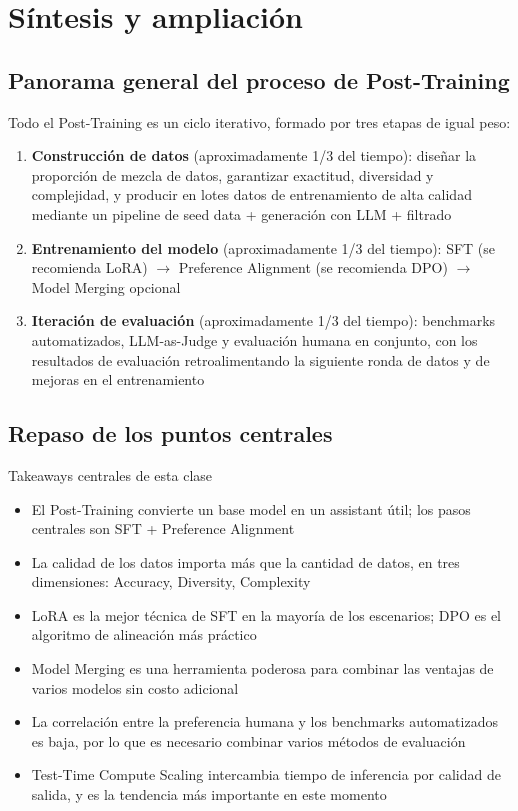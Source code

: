 \section{Síntesis y ampliación}

\subsection{Panorama general del proceso de Post-Training}

Todo el Post-Training es un ciclo iterativo, formado por tres etapas de igual peso:

\begin{enumerate}
    \item \textbf{Construcción de datos} (aproximadamente 1/3 del tiempo): diseñar la proporción de mezcla de datos, garantizar exactitud, diversidad y complejidad, y producir en lotes datos de entrenamiento de alta calidad mediante un pipeline de seed data + generación con LLM + filtrado
    \item \textbf{Entrenamiento del modelo} (aproximadamente 1/3 del tiempo): SFT (se recomienda LoRA) $\rightarrow$ Preference Alignment (se recomienda DPO) $\rightarrow$ Model Merging opcional
    \item \textbf{Iteración de evaluación} (aproximadamente 1/3 del tiempo): benchmarks automatizados, LLM-as-Judge y evaluación humana en conjunto, con los resultados de evaluación retroalimentando la siguiente ronda de datos y de mejoras en el entrenamiento
\end{enumerate}

\subsection{Repaso de los puntos centrales}

\begin{importantbox}{Takeaways centrales de esta clase}
\begin{itemize}
    \item El Post-Training convierte un base model en un assistant útil; los pasos centrales son SFT + Preference Alignment
    \item La calidad de los datos importa más que la cantidad de datos, en tres dimensiones: Accuracy, Diversity, Complexity
    \item LoRA es la mejor técnica de SFT en la mayoría de los escenarios; DPO es el algoritmo de alineación más práctico
    \item Model Merging es una herramienta poderosa para combinar las ventajas de varios modelos sin costo adicional
    \item La correlación entre la preferencia humana y los benchmarks automatizados es baja, por lo que es necesario combinar varios métodos de evaluación
    \item Test-Time Compute Scaling intercambia tiempo de inferencia por calidad de salida, y es la tendencia más importante en este momento
\end{itemize}
\end{importantbox}

